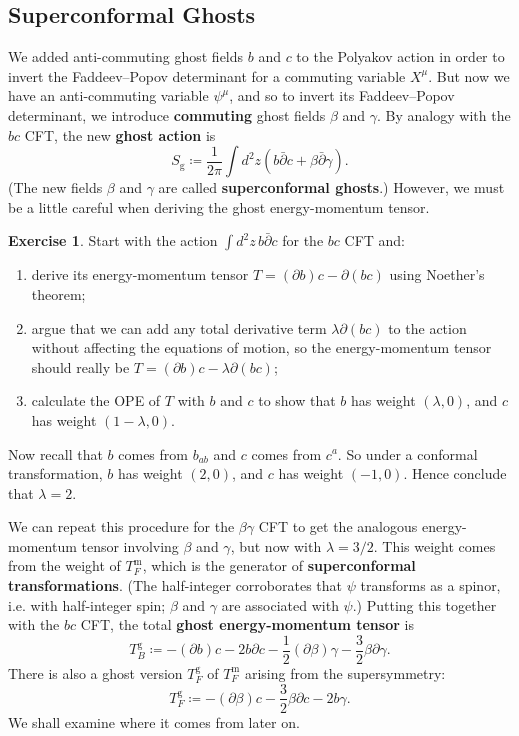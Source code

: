 \documentclass{report}
\theoremstyle{plain}
\theoremstyle{definition}
\newtheorem{exercise}{Exercise}[section]
\theoremstyle{remark}
\newcommand{\di}{\partial}
\newcommand{\bdi}{\bar{\di}}
\begin{document}
\subsection{Superconformal Ghosts}

We added anti-commuting ghost fields $b$ and $c$ to the Polyakov
action in order to invert the Faddeev--Popov determinant for a
commuting variable $X^\mu$. But now we have an anti-commuting variable
$\psi^\mu$, and so to invert its Faddeev--Popov determinant, we
introduce {\bf commuting} ghost fields $\beta$ and $\gamma$. By
analogy with the $bc$ CFT, the new {\bf ghost action} is
\[ S_{\text{g}} \coloneqq \frac{1}{2\pi} \int d^2z (b \bdi c + \beta \bdi \gamma). \]
(The new fields $\beta$ and $\gamma$ are called {\bf superconformal
  ghosts}.) However, we must be a little careful when deriving the
ghost energy-momentum tensor.

\begin{exercise}
  Start with the action $\int d^2z \, b \bdi c$ for the $bc$
  CFT and:
  \begin{enumerate}
  \item derive its energy-momentum tensor $T = (\di b) c - \di (bc)$
    using Noether's theorem;
  \item argue that we can add any total derivative term $\lambda \di
    (bc)$ to the action without affecting the equations of motion, so
    the energy-momentum tensor should really be $T = (\di b)c -
    \lambda \di (bc)$;
  \item calculate the OPE of $T$ with $b$ and $c$ to show that $b$ has
    weight $(\lambda, 0)$, and $c$ has weight $(1-\lambda, 0)$.
  \end{enumerate}
  Now recall that $b$ comes from $b_{ab}$ and $c$ comes from $c^a$. So
  under a conformal transformation, $b$ has weight $(2, 0)$, and $c$
  has weight $(-1, 0)$. Hence conclude that $\lambda = 2$.
\end{exercise}

We can repeat this procedure for the $\beta\gamma$ CFT to get the
analogous energy-momentum tensor involving $\beta$ and $\gamma$, but
now with $\lambda = 3/2$. This weight comes from the weight of
$T_F^{\text{m}}$, which is the generator of {\bf superconformal
  transformations}. (The half-integer corroborates that $\psi$
transforms as a spinor, i.e. with half-integer spin; $\beta$ and
$\gamma$ are associated with $\psi$.) Putting this together with the
$bc$ CFT, the total {\bf ghost energy-momentum tensor} is
\[ T_B^{\text{g}} \coloneqq -(\di b) c - 2b \di c - \frac{1}{2}(\di \beta)\gamma - \frac{3}{2} \beta \di \gamma. \]
There is also a ghost version $T_F^{\text{g}}$ of $T_F^{\text{m}}$
arising from the supersymmetry:
\[ T_F^{\text{g}} \coloneqq -(\di \beta)c - \frac{3}{2}\beta \di c - 2b\gamma. \]
We shall examine where it comes from later on.
\end{document}
